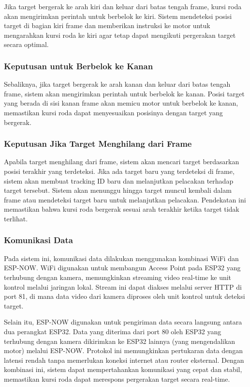 Jika target bergerak ke arah kiri dan keluar dari batas tengah frame, kursi roda akan mengirimkan perintah untuk berbelok ke kiri. Sistem mendeteksi posisi target di bagian kiri frame dan memberikan instruksi ke motor untuk mengarahkan kursi roda ke kiri agar tetap dapat mengikuti pergerakan target secara optimal.

\subsubsection*{Keputusan untuk Berbelok ke Kanan}
\label{subsubsec:keputusan_belok_kanan}

Sebaliknya, jika target bergerak ke arah kanan dan keluar dari batas tengah frame, sistem akan mengirimkan perintah untuk berbelok ke kanan. Posisi target yang berada di sisi kanan frame akan memicu motor untuk berbelok ke kanan, memastikan kursi roda dapat menyesuaikan posisinya dengan target yang bergerak.

\subsubsection*{Keputusan Jika Target Menghilang dari Frame}
\label{subsubsec:keputusan_target_menghilang}

Apabila target menghilang dari frame, sistem akan mencari target berdasarkan posisi terakhir yang terdeteksi. Jika ada target baru yang terdeteksi di frame, sistem akan membuat tracking ID baru dan melanjutkan pelacakan terhadap target tersebut. Sistem akan menunggu hingga target muncul kembali dalam frame atau mendeteksi target baru untuk melanjutkan pelacakan. Pendekatan ini memastikan bahwa kursi roda bergerak sesuai arah terakhir ketika target tidak terlihat.

\subsubsection{Komunikasi Data}
\label{subsubsec:komunikasi_data}

Pada sistem ini, komunikasi data dilakukan menggunakan kombinasi WiFi dan ESP-NOW. WiFi digunakan untuk membangun Access Point pada ESP32 yang terhubung dengan kamera, memungkinkan streaming video real-time ke unit kontrol melalui jaringan lokal. Stream ini dapat diakses melalui server HTTP di port 81, di mana data video dari kamera diproses oleh unit kontrol untuk deteksi target.

Selain itu, ESP-NOW digunakan untuk pengiriman data secara langsung antara dua perangkat ESP32. Data yang diterima dari port 80 oleh ESP32 yang terhubung dengan kamera dikirimkan ke ESP32 lainnya (yang mengendalikan motor) melalui ESP-NOW. Protokol ini memungkinkan pertukaran data dengan latensi rendah tanpa memerlukan koneksi internet atau router eksternal. Dengan kombinasi ini, sistem dapat mempertahankan komunikasi yang cepat dan stabil, memastikan kursi roda dapat merespons pergerakan target secara real-time.

